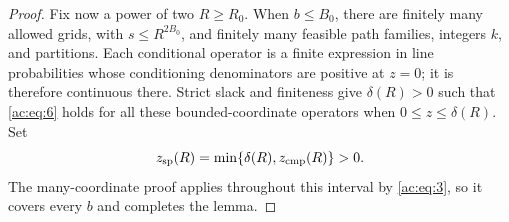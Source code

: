 \begin{proof}
Fix now a power of two \(R\ge R_0\). When \(b\le B_0\), there are finitely
many allowed grids, with \(s\le R^{2B_0}\), and finitely many feasible path
families, integers \(k\), and partitions. Each conditional operator is a
finite expression in line probabilities whose conditioning denominators are
positive at \(z=0\); it is therefore continuous there. Strict slack and
finiteness give \(\delta(R)>0\) such that \eqref{ac:eq:6} holds for all these
bounded-coordinate operators when \(0\le z\le\delta(R)\). Set
\[
 z_{\rm sp}(R)=\min\{\delta(R),z_{\rm cmp}(R)\}>0.
\]
The many-coordinate proof applies throughout this interval by
\eqref{ac:eq:3}, so it covers every \(b\) and completes the lemma.
\end{proof}
